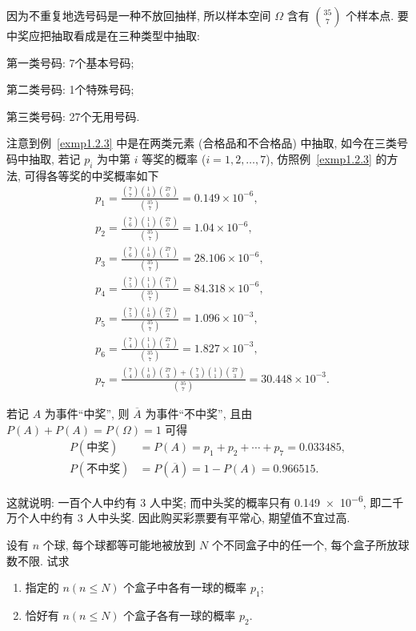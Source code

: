 \begin{solution}
  因为不重复地选号码是一种不放回抽样,
  所以样本空间 $\Omega$ 含有 $\binom{35}{7}$ 个样本点.
  要中奖应把抽取看成是在三种类型中抽取:

  第一类号码:
  7个基本号码;

  第二类号码:
  1个特殊号码;

  第三类号码:
  27个无用号码.

  注意到例~\ref{exmp1.2.3} 中是在两类元素 (合格品和不合格品) 中抽取,
  如今在三类号码中抽取,
  若记 $p_i$ 为中第 $i$ 等奖的概率 ($i=1, 2, \dotsc, 7$),
  仿照例~\ref{exmp1.2.3} 的方法,
  可得各等奖的中奖概率如下
  \begin{align*}
    & p_1 = \frac{\binom{7}{7} \binom{1}{0} \binom{27}{0}}{\binom{35}{7}} = 0.149 \times 10 ^{-6},\\
    & p_2 = \frac{\binom{7}{6} \binom{1}{1} \binom{27}{0}}{\binom{35}{7}} = 1.04 \times 10 ^{-6},\\
    & p_3 = \frac{\binom{7}{6} \binom{1}{0} \binom{27}{1}}{\binom{35}{7}} = 28.106 \times 10 ^{-6},\\
    & p_4 = \frac{\binom{7}{5} \binom{1}{1} \binom{27}{1}}{\binom{35}{7}} = 84.318 \times 10 ^{-6},\\
    & p_5 = \frac{\binom{7}{5} \binom{1}{0} \binom{27}{2}}{\binom{35}{7}} = 1.096 \times 10 ^{-3},\\
    & p_6 = \frac{\binom{7}{4} \binom{1}{1} \binom{27}{2}}{\binom{35}{7}} = 1.827 \times 10 ^{-3},\\
    & p_7 = \frac{\binom{7}{4} \binom{1}{0} \binom{27}{3} + \binom{7}{3} \binom{1}{1} \binom{27}{3}}{\binom{35}{7}} = 30.448 \times 10 ^{-3}.
  \end{align*}

  若记 $A$ 为事件“中奖”,
  则 $\overline{A}$ 为事件“不中奖”,
  且由 $P(A) + P(A) = P (\Omega) = 1$ 可得
  \begin{align*}
    P (\text{中奖}) &= P (A) = p_1 + p_2 + \dotsb + p_7 = 0.033485,\\
    P (\text{不中奖}) &= P (\overline{A}) = 1 - P (A) = 0.966515.
  \end{align*}

  这就说明:
  一百个人中约有 3 人中奖;
  而中头奖的概率只有 \num{0.149e-6},
  即二千万个人中约有 3 人中头奖.
  因此购买彩票要有平常心,
  期望值不宜过高.
\end{solution}

\begin{example}[盒子模型]
  设有 $n$ 个球,
  每个球都等可能地被放到 $N$ 个不同盒子中的任一个,
  每个盒子所放球数不限.
  试求
  \begin{enumerate}
    \item 指定的 $n (n \le N)$ 个盒子中各有一球的概率 $p_1$;
    \item 恰好有 $n (n \le N)$ 个盒子各有一球的概率 $p_2$.
  \end{enumerate}
\end{example}

